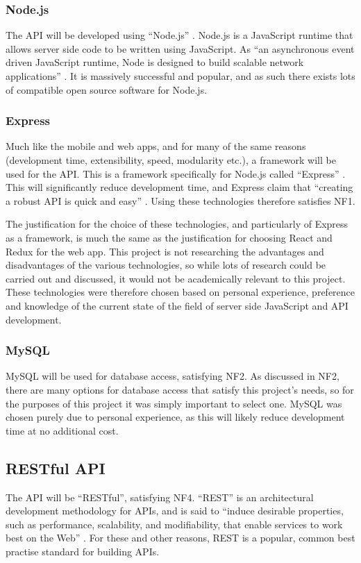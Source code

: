 \documentclass[11pt,openright,a4paper]{report}
\begin{document}
\subsubsection{Node.js}
The API will be developed using \enquote{Node.js} \parencite{nodejs}. Node.js is a JavaScript runtime that allows server side code to be written using JavaScript. As \enquote{an asynchronous event driven JavaScript runtime, Node is designed to build scalable network applications} \parencite{nodejsabout}. It is massively successful and popular, and as such there exists lots of compatible open source software for Node.js.

\subsubsection{Express}
Much like the mobile and web apps, and for many of the same reasons (development time, extensibility, speed, modularity etc.), a framework will be used for the API. This is a framework specifically for Node.js called \enquote{Express} \parencite{expressjs}. This will significantly reduce development time, and Express claim that \enquote{creating a robust API is quick and easy} \parencite{expressjs}. Using these technologies therefore satisfies NF1.

The justification for the choice of these technologies, and particularly of Express as a framework, is much the same as the justification for choosing React and Redux for the web app. This project is not researching the advantages and disadvantages of the various technologies, so while lots of research could be carried out and discussed, it would not be academically relevant to this project. These technologies were therefore chosen based on personal experience, preference and knowledge of the current state of the field of server side JavaScript and API development.

\subsubsection{MySQL}
MySQL will be used for database access, satisfying NF2. As discussed in NF2, there are many options for database access that satisfy this project's needs, so for the purposes of this project it was simply important to select one. MySQL was chosen purely due to personal experience, as this will likely reduce development time at no additional cost.

\subsection{RESTful API}
The API will be \enquote{RESTful}, satisfying NF4. \enquote{REST} is an architectural development methodology for APIs, and is said to \enquote{induce desirable properties, such as performance, scalability, and modifiability, that enable services to work best on the Web} \parencite{oraclerest}. For these and other reasons, REST is a popular, common best practise standard for building APIs.
\end{document}
